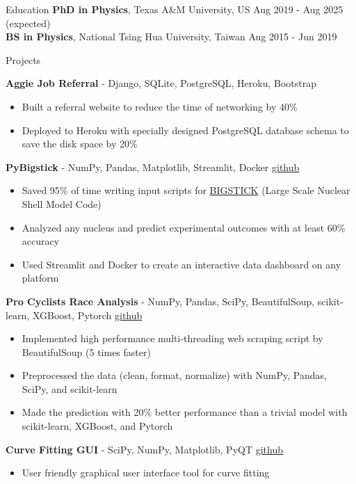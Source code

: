 \documentclass{resume}
\begin{document}
\vspace{-2.75em}
\begin{rSection}{Education}
{\bf PhD in Physics}, Texas A\&M University, US \hfill {Aug 2019 - Aug 2025 (expected)} \\
{\bf BS in Physics}, National Tsing Hua University, Taiwan \hfill {Aug 2015 - Jun 2019}
\vspace{-0.5em}


\begin{rSection}{Projects}
    \vspace{-1.25em}
    \item \textbf{Aggie Job Referral} - {Django, SQLite, PostgreSQL, Heroku, Bootstrap}
        \begin{itemize}
        \itemsep -3pt {}
        \item Built a referral website to reduce the time of networking by 40\%
        \item Deployed to Heroku with specially designed PostgreSQL database schema to save the disk space by 20\%
        \end{itemize}
    \item \textbf{PyBigstick} - {NumPy, Pandas, Matplotlib, Streamlit, Docker} \hfill {\href{https://github.com/noctildon/pyBigstick}{github}}
        \begin{itemize}
        \itemsep -3pt {}
        \item Saved 95\% of time writing input scripts for \href{https://github.com/cwjsdsu/BigstickPublick}{BIGSTICK} (Large Scale Nuclear Shell Model Code)
        \item Analyzed any nucleus and predict experimental outcomes with at least 60\% accuracy
        \item Used Streamlit and Docker to create an interactive data dashboard on any platform
        \end{itemize}
    \item \textbf{Pro Cyclists Race Analysis} - {NumPy, Pandas, SciPy, BeautifulSoup, scikit-learn, XGBoost, Pytorch} \hfill {\href{https://github.com/noctildon/pro_cyclists}{github}}
        \begin{itemize}
        \itemsep -3pt {}
        \item Implemented high performance multi-threading web scraping script by BeautifulSoup (5 times faster)
        \item Preprocessed the data (clean, format, normalize) with NumPy, Pandas, SciPy, and scikit-learn
        \item Made the prediction with 20\% better performance than a trivial model with scikit-learn, XGBoost, and Pytorch
        \end{itemize}
    \item \textbf{Curve Fitting GUI} - {SciPy, NumPy, Matplotlib, PyQT} \hfill {\href{https://github.com/noctildon/curve_fitting}{github}}
        \begin{itemize}
        \itemsep -3pt {}
        \item User friendly graphical user interface tool for curve fitting
        \end{itemize}
\end{rSection}




\end{rSection}
\end{document}
